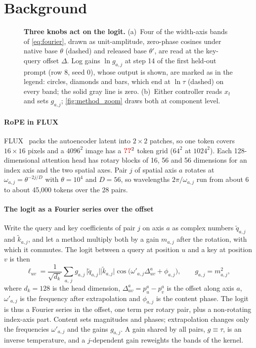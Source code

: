 \section{Background}\label{sec:background}

\begin{figure}[b]
\centering
{}
\caption{\textbf{Three knobs act on the logit.} (a)~Four of the  width-axis bands of \cref{eq:fourier}, drawn as unit-amplitude, zero-phase cosines under native base $\theta$ (dashed) and released base $\theta'$, are read at the key-query offset $\Delta$. Log gains $\ln g_{a,j}$ at step 14 of the first held-out prompt (row 8, seed 0), whose \segaofficial{} output is shown, are marked as in the legend: \segaofficial{} circles, \constancytm{} diamonds and \tempsb{} bars, which end at $\ln\tau$ (dashed) on every band; the solid gray line is zero. (b)~Either controller reads $x_t$ and sets $g_{a,j}$; \cref{fig:method_zoom} draws both at component level.}
\label{fig:method}
\end{figure}

\paragraph{RoPE in FLUX}
FLUX~\citep{flux2024} packs the autoencoder latent into $2\times2$ patches, so one token covers $16\times16$ pixels and a $4096^2$ image has a $\N{c@tokside}^2$ token grid ($64^2$ at $1024^2$). Each 128-dimensional attention head has rotary blocks of 16, 56 and 56 dimensions for an index axis and the two spatial axes. Pair $j$ of spatial axis $a$ rotates at $\omega_{a,j}=\theta^{-2j/D}$ with $\theta=10^4$ and $D=56$, so wavelengths $2\pi/\omega_{a,j}$ run from about 6 to about 45{,}000 tokens over the 28 pairs.

\paragraph{The logit as a Fourier series over the offset}
Write the query and key coefficients of pair $j$ on axis $a$ as complex numbers $\tilde q_{a,j}$ and $\tilde k_{a,j}$, and let a method multiply both by a gain $m_{a,j}$ after the rotation, with which it commutes. The logit between a query at position $u$ and a key at position $v$ is then
\begin{equation}
\ell_{uv}=\frac{1}{\sqrt{d_k}}\sum_{a,\,j} g_{a,j}\,\bigl|\tilde q_{a,j}\bigr|\bigl|\tilde k_{a,j}\bigr|\cos\!\bigl(\omega'_{a,j}\Delta^{a}_{uv}+\phi_{a,j}\bigr),\qquad g_{a,j}=m_{a,j}^{2},
\label{eq:fourier}
\end{equation}
where $d_k=128$ is the head dimension, $\Delta^{a}_{uv}=p^{a}_u-p^{a}_v$ is the offset along axis $a$, $\omega'_{a,j}$ is the frequency after extrapolation and $\phi_{a,j}$ is the content phase. The logit is thus a Fourier series in the offset, one term per rotary pair, plus a non-rotating index-axis part. Content sets magnitudes and phases; extrapolation changes only the frequencies $\omega'_{a,j}$ and the gains $g_{a,j}$. A gain shared by all pairs, $g\equiv\tau$, is an inverse temperature, and a $j$-dependent gain reweights the bands of the kernel.

